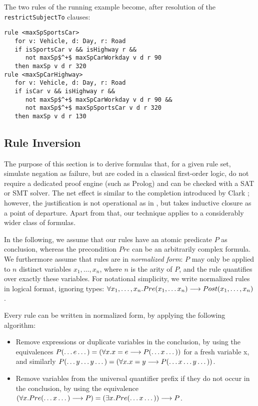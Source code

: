 \begin{example} The two rules of the running example become, after resolution
  of the \texttt{restrictSubjectTo} clauses:
\begin{lstlisting}[mathescape=true]
rule <maxSpSportsCar>
   for v: Vehicle, d: Day, r: Road
   if isSportsCar v && isHighway r &&
      not maxSp$^+$ maxSpCarWorkday v d r 90
   then maxSp v d r 320
rule <maxSpCarHighway>
   for v: Vehicle, d: Day, r: Road
   if isCar v && isHighway r &&
      not maxSp$^+$ maxSpCarWorkday v d r 90 &&
      not maxSp$^+$ maxSpSportsCar v d r 320
   then maxSp v d r 130
\end{lstlisting}
\end{example}

\subsection{Rule Inversion}\label{sec:rule_inversion}

The purpose of this section is to derive formulas that, for a given rule set,
simulate negation as failure, but are coded in a classical first-order logic,
do not require a dedicated proof engine (such as Prolog) and can be checked
with a SAT or SMT solver. The net effect is similar to the completion
introduced by Clark \cite{clark_NegAsFailure_1978}; however, the justification
is not operational as in \cite{clark_NegAsFailure_1978}, but takes 
inductive closure as a point of departure. Apart from that, our technique
applies to a considerably wider class of formulas.

In the following, we assume that our rules have an atomic predicate $P$ as
conclusion, whereas the precondition $Pre$ can be an arbitrarily complex
formula.  We furthermore assume that rules are in \emph{normalized form}: $P$
may only be applied to $n$ distinct variables $x_1, \dots, x_n$, where $n$ is
the arity of $P$, and the rule quantifies over exactly these variables.
For notational simplicity, we write normalized rules in logical format,
ignoring types:
$\forall x_1, \dots, x_n. Pre(x_1, \dots x_n) \longrightarrow Post(x_1, \dots, x_n)$.

Every rule can be written in normalized form, by applying the following
algorithm:
\begin{itemize}
\item Remove expressions or duplicate variables in the conclusion, by using
  the equivalences $P(\dots e \dots) = (\forall x. x = e \longrightarrow P(\dots x
  \dots))$ for a fresh variable x, and similarly $P(\dots y \dots y \dots) =
  (\forall x. x = y   \longrightarrow P(\dots x \dots y \dots))$.
\item Remove variables from the universal quantifier prefix if they do not
  occur in the conclusion, by using the equivalence
  $(\forall x. Pre(\dots x \dots) \longrightarrow P) = (\exists x. Pre(\dots x \dots))
  \longrightarrow P$.
\end{itemize}

